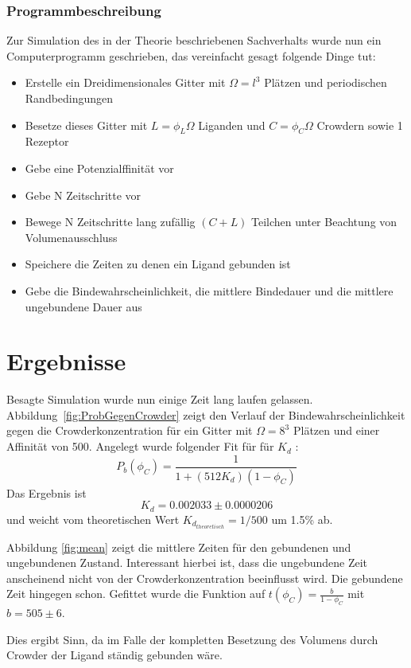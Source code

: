 \documentclass[bachelor,       %
               twoside,        %
               BCOR10mm,       %
               english,ngerman, %
               ]{GAUBM}
\begin{document}
\subsection{Programmbeschreibung}
Zur Simulation des in der Theorie beschriebenen Sachverhalts wurde nun ein Computerprogramm geschrieben, das
vereinfacht gesagt folgende Dinge tut:
\begin{itemize}
\item Erstelle ein Dreidimensionales Gitter mit $\Omega = l^3$ Plätzen und periodischen Randbedingungen
\item Besetze dieses Gitter mit $L = \phi_L\Omega$ Liganden und $C = \phi_C\Omega$ Crowdern sowie 1 Rezeptor
\item Gebe eine Potenzialffinität vor
\item Gebe N Zeitschritte vor
\item Bewege N Zeitschritte lang zufällig $(C+L)$ Teilchen unter Beachtung von Volumenausschluss
\item Speichere die Zeiten zu denen ein Ligand gebunden ist
\item Gebe die Bindewahrscheinlichkeit, die mittlere Bindedauer und die mittlere ungebundene Dauer aus
\end{itemize}

\chapter{Ergebnisse}
Besagte Simulation wurde nun einige Zeit lang laufen gelassen.
Abbildung~\ref{fig:ProbGegenCrowder} zeigt den Verlauf der Bindewahrscheinlichkeit
gegen die Crowderkonzentration für ein Gitter mit $\Omega = 8^3$ Plätzen und einer
Affinität von 500. Angelegt wurde folgender Fit für für $K_d$ :
\begin{equation}
P_b(\phi_C) = \frac{1}{1+(512K_d)(1-\phi_C)}
\end{equation}
Das Ergebnis ist
\begin{equation}
K_d = 0.002033 \pm 0.0000206
\end{equation}
und weicht vom theoretischen Wert $K_{d_{theoretisch}} = 1/500 $ um 1.5\% ab.

Abbildung \ref{fig:mean} zeigt die mittlere Zeiten für den gebundenen und ungebundenen
Zustand. Interessant hierbei ist, dass die ungebundene Zeit anscheinend nicht von
der Crowderkonzentration beeinflusst wird. Die gebundene Zeit hingegen schon.
Gefittet wurde die Funktion auf $t(\phi_C) = \frac{b}{1-\phi_C}$ mit $b = 505 \pm 6$.

Dies ergibt Sinn, da im Falle der kompletten Besetzung des Volumens durch Crowder der
Ligand ständig gebunden wäre.
\end{document}
